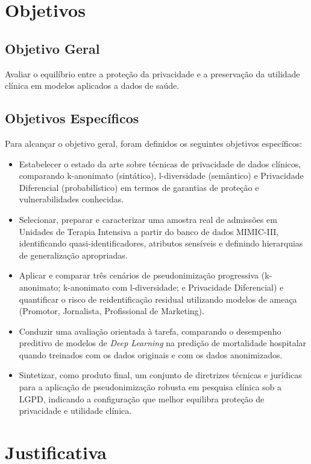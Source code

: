\section{Objetivos}
\label{sec:intro-objetivos}

\subsection{Objetivo Geral}
Avaliar o equilíbrio entre a proteção da privacidade e a preservação da utilidade clínica em modelos aplicados a dados de saúde.

\subsection{Objetivos Específicos}
Para alcançar o objetivo geral, foram definidos os seguintes objetivos específicos:

\begin{itemize}
    \item Estabelecer o estado da arte sobre técnicas de privacidade de dados clínicos, comparando k-anonimato (sintático), l-diversidade (semântico) e Privacidade Diferencial (probabilístico) em termos de garantias de proteção e vulnerabilidades conhecidas.
    \item Selecionar, preparar e caracterizar uma amostra real de admissões em Unidades de Terapia Intensiva a partir do banco de dados MIMIC-III, identificando quasi-identificadores, atributos sensíveis e definindo hierarquias de generalização apropriadas.
    \item Aplicar e comparar três cenários de pseudonimização progressiva (k-anonimato; k-anonimato com l-diversidade; e Privacidade Diferencial) e quantificar o risco de reidentificação residual utilizando modelos de ameaça (Promotor, Jornalista, Profissional de Marketing).
    \item Conduzir uma avaliação orientada à tarefa, comparando o desempenho preditivo de modelos de \textit{Deep Learning} na predição de mortalidade hospitalar quando treinados com os dados originais e com os dados anonimizados.
    \item Sintetizar, como produto final, um conjunto de diretrizes técnicas e jurídicas para a aplicação de pseudonimização robusta em pesquisa clínica sob a LGPD, indicando a configuração que melhor equilibra proteção de privacidade e utilidade clínica.
\end{itemize}

\section{Justificativa}
\label{sec:intro-justificativa}

